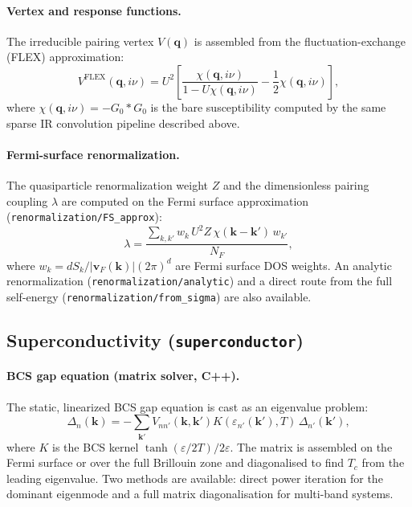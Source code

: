\paragraph{Vertex and response functions.}
The irreducible pairing vertex $V(\mathbf{q})$ is assembled from the
fluctuation-exchange (FLEX) approximation:
\[
    V^{\mathrm{FLEX}}(\mathbf{q},i\nu) =
    U^2 \left[\frac{\chi(\mathbf{q},i\nu)}{1 - U\chi(\mathbf{q},i\nu)}
    - \frac{1}{2}\chi(\mathbf{q},i\nu)\right],
\]
where $\chi(\mathbf{q},i\nu) = -G_0 * G_0$ is the bare susceptibility computed by
the same sparse IR convolution pipeline described above.

\paragraph{Fermi-surface renormalization.}
The quasiparticle renormalization weight $Z$ and the dimensionless pairing coupling
$\lambda$ are computed on the Fermi surface approximation
(\texttt{renormalization/FS\_approx}):
\[
    \lambda = \frac{\sum_{k,k'} w_k\, U^2 Z\,\chi(\mathbf{k}-\mathbf{k}')\, w_{k'}}
                   {N_F},
\]
where $w_k = dS_k / |\mathbf{v}_F(\mathbf{k})|(2\pi)^d$ are Fermi surface DOS
weights.  An analytic renormalization (\texttt{renormalization/analytic}) and a
direct route from the full self-energy (\texttt{renormalization/from\_sigma}) are
also available.

\subsection{Superconductivity (\texttt{superconductor})}

\paragraph{BCS gap equation (matrix solver, C++).}
The static, linearized BCS gap equation is cast as an eigenvalue problem:
\[
    \Delta_n(\mathbf{k}) =
    -\sum_{\mathbf{k}'} V_{nn'}(\mathbf{k},\mathbf{k}')
    K(\varepsilon_{n'}(\mathbf{k}'),T)\,\Delta_{n'}(\mathbf{k}'),
\]
where $K$ is the BCS kernel $\tanh(\varepsilon/2T)/2\varepsilon$.  The matrix is
assembled on the Fermi surface or over the full Brillouin zone and diagonalised to
find $T_c$ from the leading eigenvalue.  Two methods are available: direct power
iteration for the dominant eigenmode and a full matrix diagonalisation for multi-band
systems.

